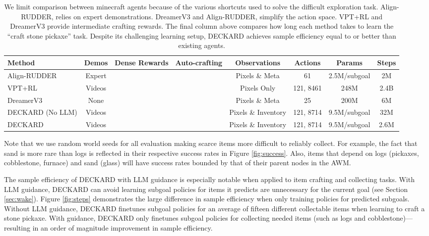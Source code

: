 \documentclass[nohyperref]{article}
\theoremstyle{plain}
\theoremstyle{definition}
\theoremstyle{remark}
\newcommand{\cmark}{\ding{51}}
\newcommand{\xmark}{\ding{55}}
\newcommand{\agentshort}{\textsc{DECKARD}}
\begin{document}
\begin{table}
    \small
    \setlength{\tabcolsep}{2.75pt}
    \center
    \begin{tabular}{lccccccc}
        Method & Demos & Dense Rewards & Auto-crafting & Observations & Actions & Params & Steps \\
        \midrule
        Align-RUDDER \cite{Patil2020AlignRUDDERLF} & Expert & \xmark & \cmark & Pixels \& Meta & 61 & 2.5M/subgoal & 2M \\
        VPT+RL \cite{bakervideo} & Videos & \cmark & \xmark & Pixels Only & 121, 8461 & 248M & 2.4B \\
        DreamerV3 \cite{danijardreamer} & None & \cmark & \cmark & Pixels \& Meta & 25 & 200M & 6M \\
        \agentshort{} (No LLM)    & Videos & \xmark & \cmark & Pixels \& Inventory & 121, 8714 & 9.5M/subgoal & 32M \\
        \agentshort{}             & Videos & \xmark & \cmark & Pixels \& Inventory & 121, 8714 & 9.5M/subgoal & 2.6M
    \end{tabular}
    \caption{
    We limit comparison between minecraft agents because of the various shortcuts used to solve the difficult exploration task. 
    Align-RUDDER, relies on expert demonstrations. 
    DreamerV3 and Align-RUDDER, simplify the action space. 
    VPT+RL and DreamerV3 provide intermediate crafting rewards. 
    The final column above compares how long each method takes to learn the ``craft stone pickaxe'' task.
    Despite its challenging learning setup, \agentshort{} achieves sample efficiency equal to or better than existing agents.
    }
    \label{tab:agents}
\end{table}

Note that we use random world seeds for all evaluation making scarce items more difficult to reliably collect.
For example, the fact that sand is more rare than logs is reflected in their respective success rates in Figure \ref{fig:success}.
Also, items that depend on logs (pickaxes, cobblestone, furnace) and sand (glass) will have success rates bounded by that of their parent nodes in the AWM.

The sample efficiency of \agentshort{} with LLM guidance is especially notable when applied to item crafting and collecting tasks.
With LLM guidance, \agentshort{} can avoid learning subgoal policies for items it predicts are unnecessary for the current goal (see Section \ref{sec:wake}).
Figure \ref{fig:steps} demonstrates the large difference in sample efficiency when only training policies for predicted subgoals. 
Without LLM guidance, \agentshort{} finetunes subgoal policies for an average of fifteen different collectable items when learning to craft a stone pickaxe.
With guidance, \agentshort{} only finetunes subgoal policies for collecting needed items (such as logs and cobblestone)---resulting in an order of magnitude improvement in sample efficiency.
\end{document}
